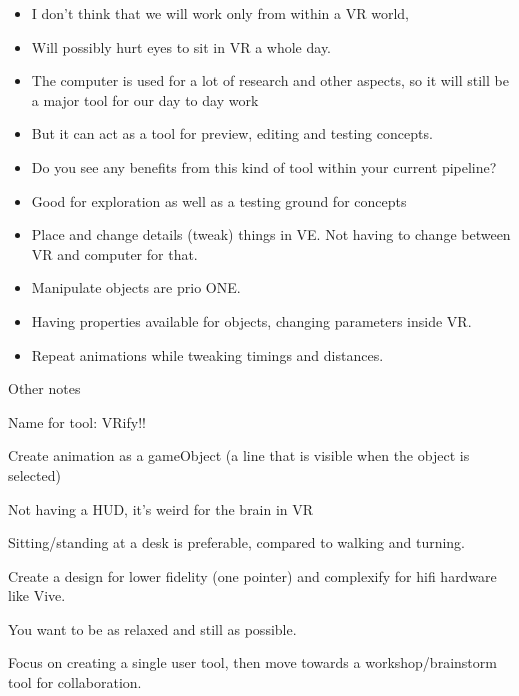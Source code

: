 \begin{enumerate}
\begin{itemize}
\item I don't think that we will work only from within a VR world,
\item Will possibly hurt eyes to sit in VR a whole day.
\item The computer is used for a lot of research and other aspects, so it will still be a major tool for our day to day work
\item But it can act as a tool for preview, editing and testing concepts.
\item Do you see any benefits from this kind of tool within your current pipeline?
\item Good for exploration as well as a testing ground for concepts
\item Place and change details (tweak) things in VE. Not having to change between VR and computer for that.
\item Manipulate objects are prio ONE.
\item Having properties available for objects, changing parameters inside VR.
\item Repeat animations while tweaking timings and distances.

\end{itemize}
\end{enumerate}
Other notes

Name for tool: VRify!!

Create animation as a gameObject (a line that is visible when the object is selected)

Not having a HUD, it's weird for the brain in VR

Sitting/standing at a desk is preferable, compared to walking and turning.

Create a design for lower fidelity (one pointer) and complexify for hifi hardware like Vive.

You want to be as relaxed and still as possible.

Focus on creating a single user tool, then move towards a workshop/brainstorm tool for collaboration.
